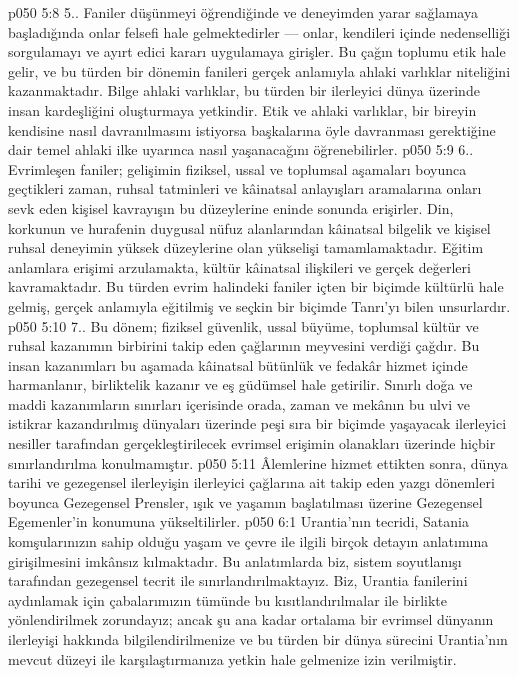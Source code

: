 \vs p050 5:8 5.\bibnobreakspace {}. Faniler düşünmeyi öğrendiğinde ve deneyimden yarar sağlamaya başladığında onlar felsefi hale gelmektedirler --- onlar, kendileri içinde nedenselliği sorgulamayı ve ayırt edici kararı uygulamaya girişler. Bu çağın toplumu etik hale gelir, ve bu türden bir dönemin fanileri gerçek anlamıyla ahlaki varlıklar niteliğini kazanmaktadır. Bilge ahlaki varlıklar, bu türden bir ilerleyici dünya üzerinde insan kardeşliğini oluşturmaya yetkindir. Etik ve ahlaki varlıklar, bir bireyin kendisine nasıl davranılmasını istiyorsa başkalarına öyle davranması gerektiğine dair temel ahlaki ilke uyarınca nasıl yaşanacağını öğrenebilirler.
\vs p050 5:9 6.. Evrimleşen faniler; gelişimin fiziksel, ussal ve toplumsal aşamaları boyunca geçtikleri zaman, ruhsal tatminleri ve kâinatsal anlayışları aramalarına onları sevk eden kişisel kavrayışın bu düzeylerine eninde sonunda erişirler. Din, korkunun ve hurafenin duygusal nüfuz alanlarından kâinatsal bilgelik ve kişisel ruhsal deneyimin yüksek düzeylerine olan yükselişi tamamlamaktadır. Eğitim anlamlara erişimi arzulamakta, kültür kâinatsal ilişkileri ve gerçek değerleri kavramaktadır. Bu türden evrim halindeki faniler içten bir biçimde kültürlü hale gelmiş, gerçek anlamıyla eğitilmiş ve seçkin bir biçimde Tanrı’yı bilen unsurlardır.
\vs p050 5:10 7.. Bu dönem; fiziksel güvenlik, ussal büyüme, toplumsal kültür ve ruhsal kazanımın birbirini takip eden çağlarının meyvesini verdiği çağdır. Bu insan kazanımları bu aşamada kâinatsal bütünlük ve fedakâr hizmet içinde harmanlanır, birliktelik kazanır ve eş güdümsel hale getirilir. Sınırlı doğa ve maddi kazanımların sınırları içerisinde orada, zaman ve mekânın bu ulvi ve istikrar kazandırılmış dünyaları üzerinde peşi sıra bir biçimde yaşayacak ilerleyici nesiller tarafından gerçekleştirilecek evrimsel erişimin olanakları üzerinde hiçbir sınırlandırılma konulmamıştır.
\vs p050 5:11 Âlemlerine hizmet ettikten sonra, dünya tarihi ve gezegensel ilerleyişin ilerleyici çağlarına ait takip eden yazgı dönemleri boyunca Gezegensel Prensler, ışık ve yaşamın başlatılması üzerine Gezegensel Egemenler’in konumuna yükseltilirler.
\vs p050 6:1 Urantia’nın tecridi, Satania komşularınızın sahip olduğu yaşam ve çevre ile ilgili birçok detayın anlatımına girişilmesini imkânsız kılmaktadır. Bu anlatımlarda biz, sistem soyutlanışı tarafından gezegensel tecrit ile sınırlandırılmaktayız. Biz, Urantia fanilerini aydınlamak için çabalarımızın tümünde bu kısıtlandırılmalar ile birlikte yönlendirilmek zorundayız; ancak şu ana kadar ortalama bir evrimsel dünyanın ilerleyişi hakkında bilgilendirilmenize ve bu türden bir dünya sürecini Urantia’nın mevcut düzeyi ile karşılaştırmanıza yetkin hale gelmenize izin verilmiştir.
